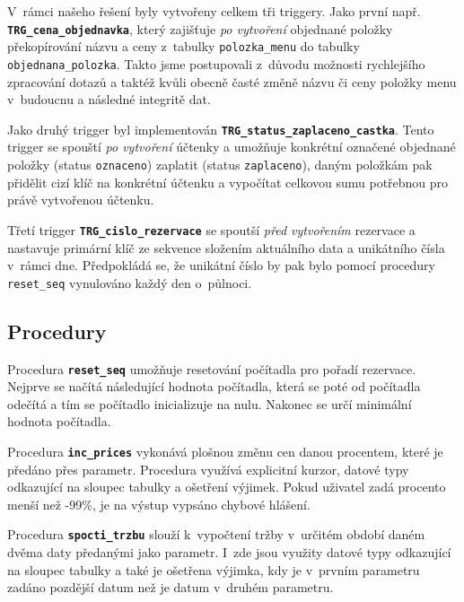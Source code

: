 \documentclass[11pt, a4paper]{article}
\begin{document}
V~rámci našeho řešení byly vytvořeny celkem tři triggery. Jako první např. \textbf{\texttt{TRG\_cena\_objednavka}}, který zajišťuje \emph{po vytvoření} objednané položky překopírování názvu a ceny z~tabulky \texttt{polozka\_menu} do tabulky \texttt{objednana\_polozka}. Takto jsme postupovali z~důvodu možnosti rychlejšího zpracování dotazů a taktéž kvůli obecně časté změně názvu či ceny položky menu v~budoucnu a následné integritě dat.

Jako druhý trigger byl implementován \textbf{\texttt{TRG\_status\_zaplaceno\_castka}}. Tento trigger se spouští \emph{po vytvoření} účtenky a umožňuje konkrétní označené objednané položky (status \texttt{oznaceno}) zaplatit (status \texttt{zaplaceno}), daným položkám pak přidělit cizí klíč na konkrétní účtenku a vypočítat celkovou sumu potřebnou pro právě vytvořenou účtenku.

Třetí trigger \textbf{\texttt{TRG\_cislo\_rezervace}} se spoutší \emph{před vytvořením} rezervace a nastavuje primární klíč ze sekvence složením aktuálního data a unikátního čísla v~rámci dne. Předpokládá se, že unikátní číslo by pak bylo pomocí procedury \texttt{reset\_seq} vynulováno každý den o~půlnoci.

\subsection{Procedury}

Procedura \textbf{\texttt{reset\_seq}} umožňuje resetování počítadla pro pořadí rezervace. Nejprve se načítá následující hodnota počítadla, která se poté od počítadla odečítá a tím se počítadlo inicializuje na nulu. Nakonec se určí minimální hodnota počítadla.

Procedura \textbf{\texttt{inc\_prices}} vykonává plošnou změnu cen danou procentem, které je předáno přes parametr. Procedura využívá explicitní kurzor, datové typy odkazující na sloupec tabulky a ošetření výjimek. Pokud uživatel zadá procento menší než -99\%, je na výstup vypsáno chybové hlášení.

Procedura \textbf{\texttt{spocti\_trzbu}} slouží k~vypočtení tržby v~určitém období daném dvěma daty předanými jako parametr. I~zde jsou využity datové typy odkazující na sloupec tabulky a také je ošetřena výjimka, kdy je v~prvním parametru zadáno pozdější datum než je datum v~druhém parametru.

\end{document}
